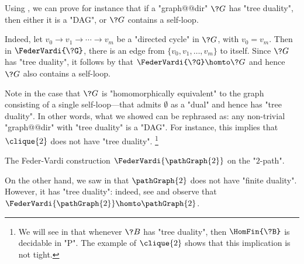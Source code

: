 \begin{example}
	\label{ex:Feder-Vardi-P2}
	Using , we can prove for instance that
	if a "graph@@dir" $\?G$ has "tree duality", then either it is a "DAG", or $\?G$ contains
	a self-loop.

	Indeed, let $v_0 \to v_1 \to \cdots \to v_m$ be a "directed cycle" in $\?G$,
	with $v_0 = v_m$. Then in $\FederVardi{\?G}$, there is an edge from
	$\{v_0,v_1,\dotsc,v_m\}$ to itself.
	Since $\?G$ has "tree duality", it follows by 
	that $\FederVardi{\?G} \homto \?G$ and hence $\?G$ also contains a self-loop.
	
	Note in the case that $\?G$ is "homomorphically equivalent" to the graph consisting
	of a single self-loop---that admits $\emptyset$ as a "dual" and hence has
	"tree duality". In other words, what we showed can be rephrased as: any
	non-trivial "graph@@dir" with "tree duality" is a "DAG".
	For instance, this implies that $\clique{2}$ does not have
	"tree duality".%
	\footnote{We will see in 
	that whenever $\?B$ has "tree duality", then $\HomFin{\?B}$ is decidable in "P".
	The example of $\clique{2}$ shows that this implication is not tight.}
	
	\begin{marginfigure}
		\centering
		\begin{tikzpicture}
			
		\end{tikzpicture}
		\caption{
			\AP\label{fig:P2-Feder-Vardi}
			The Feder-Vardi construction $\FederVardi{\pathGraph{2}}$
			on the "$2$-path".
		}
	\end{marginfigure}
	On the other hand, we saw in  that $\pathGraph{2}$ does not have
	"finite duality". However, it has "tree duality": indeed, see 
	and observe that $\FederVardi{\pathGraph{2}} \homto \pathGraph{2}$.
\end{example}